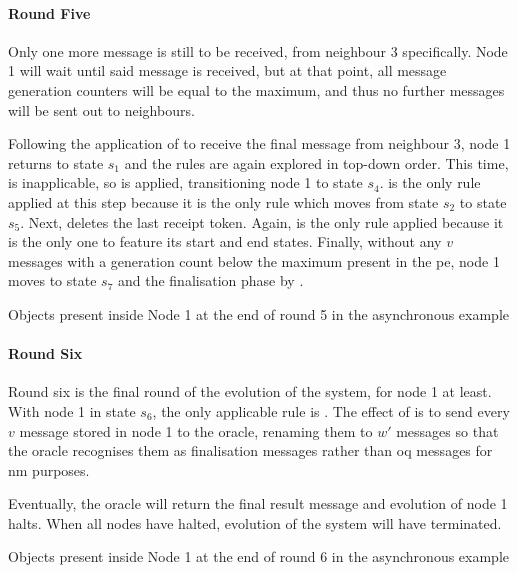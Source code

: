 \paragraph{Round Five}
Only one more message is still to be received, from neighbour 3 specifically. Node 1 will wait until said message is received, but at that point, all message generation counters will be equal to the maximum, and thus no further messages will be sent out to neighbours.

Following the application of  to receive the final message from neighbour 3, node 1 returns to state \(s_1\) and the rules are again explored in top-down order.  This time,  is inapplicable, so  is applied, transitioning node 1 to state \(s_4\).   is the only rule applied at this step because it is the only rule which moves from state \(s_2\) to state \(s_5\).  Next,  deletes the last receipt token.  Again,  is the only rule applied because it is the only one to feature its start and end states.  Finally, without any \(v\) messages with a generation count below the maximum present in the \gls{pe}, node 1 moves to state \(s_7\) and the finalisation phase by .

\begin{cpobjectsfloat}
\begin{cpobjects}
\end{cpobjects}
\caption{\label{objs:nmp:ex5}Objects present inside Node 1 at the end of round 5 in the asynchronous  example}
\end{cpobjectsfloat}

\paragraph{Round Six}
Round six is the final round of the evolution of the system, for node 1 at least.  With node 1 in state \(s_6\), the only applicable rule is .  The effect of  is to send every \(v\) message stored in node 1 to the oracle, renaming them to \(w'\) messages so that the oracle recognises them as finalisation messages rather than \gls{oq} messages for \gls{nm} purposes.

Eventually, the oracle will return the final result message and evolution of node 1 halts.  When all nodes have halted, evolution of the system will have terminated.

\begin{cpobjectsfloat}
\begin{cpobjects}
\end{cpobjects}
\caption{\label{objs:nmp:ex6}Objects present inside Node 1 at the end of round 6 in the asynchronous  example}
\end{cpobjectsfloat}